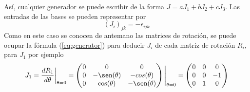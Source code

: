 Así, cualquier generador se puede escribir de la forma $J = aJ_1+ bJ_2+cJ_3$. Las entradas de las bases se pueden representar por
\begin{equation*}
  (J_i)_{jk} = -\epsilon_{ijk}
\end{equation*}
Como en este caso se conocen de antemano las matrices de rotación, se puede ocupar la fórmula (\ref{eq:generator}) para deducir $J_i$ de cada matriz de rotación $R_i$, para $J_1$ por ejemplo
\begin{equation*}
  J_1 = \frac{dR_1}{d\theta}\bigg|_{\theta=0} = \begin{pmatrix}
    0 & 0 & 0 \\ 0 & -\sen(\theta) & -cos(\theta)\\ 0 & \cos(\theta) & -\sen(\theta)
  \end{pmatrix} \Bigg|_{\theta=0} = \begin{pmatrix}
    0 & 0 & 0 \\ 0&0&-1\\ 0&1&0
  \end{pmatrix}
\end{equation*}
